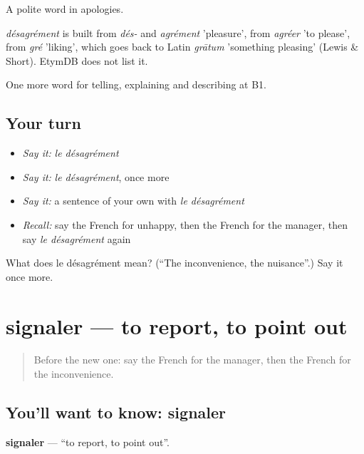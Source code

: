 A polite word in apologies.

\begin{cousinweb}
\emph{désagrément} is built from \emph{dés-} and \emph{agrément} 'pleasure', from \emph{agréer} 'to please', from \emph{gré} 'liking', which goes back to Latin \emph{grātum} 'something pleasing' (Lewis \& Short). EtymDB does not list it.
\end{cousinweb}

\begin{grammarlens}[title={What you've built}]
One more word for telling, explaining and describing at B1.
\end{grammarlens}

\subsection*{Your turn}
\begin{itemize}
\raggedright
  \item \emph{Say it:} \emph{le désagrément}
  \item \emph{Say it:} \emph{le désagrément}, once more
  \item \emph{Say it:} a sentence of your own with \emph{le désagrément}
  \item \emph{Recall:} say the French for unhappy, then the French for the manager, then say \emph{le désagrément} again
\end{itemize}

\begin{tcolorbox}[breakable,colback=teal!4,colframe=teal!35!black,title={Before you move on}]
What does le désagrément mean? (\textquotedblleft{}The inconvenience, the nuisance\textquotedblright{}.) Say it once more.
\end{tcolorbox}
\section[signaler]{signaler — to report, to point out}

\label{lesson:FR-C432-signaler}



\begin{quote}
Before the new one: say the French for the manager, then the French for the inconvenience.
\end{quote}

\subsection*{You'll want to know: signaler}
\textbf{signaler} — \textquotedblleft{}to report, to point out\textquotedblright{}.


